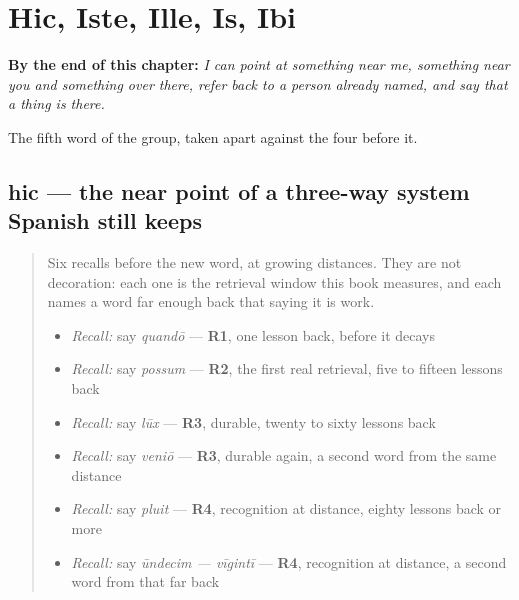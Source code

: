 
\chapter{Hic, Iste, Ille, Is, Ibi}
\label{ch:la-demonstrativa}

\begin{chapteropening}
\textbf{By the end of this chapter:} \emph{I can point at something near me, something near you and something over there, refer back to a person already named, and say that a thing is there.}

The fifth word of the group, taken apart against the four before it.
\end{chapteropening}

\section[hic, haec, hoc]{hic — the near point of a three-way system Spanish still keeps}

\label{lesson:LA-C50-hic}



\begin{quote}
Six recalls before the new word, at growing distances. They are not decoration: each one is the retrieval window this book measures, and each names a word far enough back that saying it is work.

\begin{itemize}
\raggedright
  \item \emph{Recall:} say \emph{quandō} — \textbf{R1}, one lesson back, before it decays
  \item \emph{Recall:} say \emph{possum} — \textbf{R2}, the first real retrieval, five to fifteen lessons back
  \item \emph{Recall:} say \emph{lūx} — \textbf{R3}, durable, twenty to sixty lessons back
  \item \emph{Recall:} say \emph{veniō} — \textbf{R3}, durable again, a second word from the same distance
  \item \emph{Recall:} say \emph{pluit} — \textbf{R4}, recognition at distance, eighty lessons back or more
  \item \emph{Recall:} say \emph{ūndecim — vīgintī} — \textbf{R4}, recognition at distance, a second word from that far back
\end{itemize}
\end{quote}

